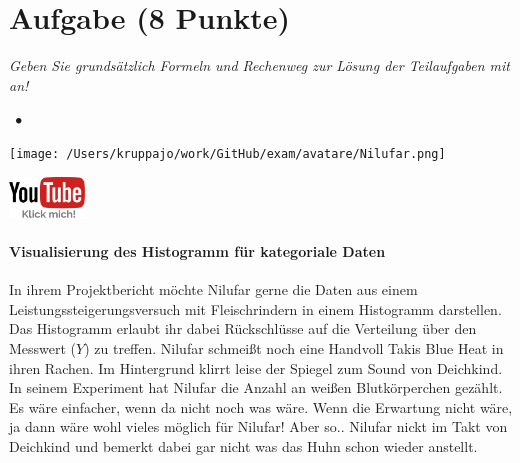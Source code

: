 \documentclass[a4paper, 9pt]{scrartcl}\usepackage[]{graphicx}\usepackage[]{xcolor}
\begin{document}
\section{Aufgabe \hfill (8 Punkte)}

\textit{Geben Sie grundsätzlich Formeln und Rechenweg zur Lösung der Teilaufgaben mit an!} \\[1Ex]
 

 
\ifcollection
\begin{flushright}
\tiny\vspace{-3Ex}
\textbf{\examinhaltstart}
\exammodulestatversuch $\;\bullet$
\exammodulebiostat
\vspace{-4Ex}
\end{flushright}
\begin{minipage}[t]{0.5\textwidth}
\texttt{[image: /Users/kruppajo/work/GitHub/exam/avatare/Nilufar.png]}
\end{minipage}
\begin{minipage}[t]{0.5\textwidth}
\hfill
\href{https://youtu.be/aXvxGC4YLqk}{\includegraphics[width = 2cm]{img/youtube}}
\end{minipage}
\vspace{-3ex}
\fi



\ifcollection
\paragraph{Visualisierung des Histogramm für kategoriale Daten}
\fi

In ihrem Projektbericht möchte Nilufar gerne die Daten aus einem Leistungssteigerungsversuch mit Fleischrindern in einem Histogramm darstellen. Das Histogramm erlaubt ihr dabei Rückschlüsse auf die Verteilung über den Messwert ($Y$) zu treffen. Nilufar schmeißt noch eine Handvoll Takis Blue Heat in ihren Rachen. Im Hintergrund klirrt leise der Spiegel zum Sound von Deichkind. In seinem Experiment hat Nilufar die Anzahl an weißen Blutkörperchen gezählt. Es wäre einfacher, wenn da nicht noch was wäre. Wenn die Erwartung nicht wäre, ja dann wäre wohl vieles möglich für Nilufar! Aber so.. Nilufar nickt im Takt von Deichkind und bemerkt dabei gar nicht was das Huhn schon wieder anstellt.
\end{document}
